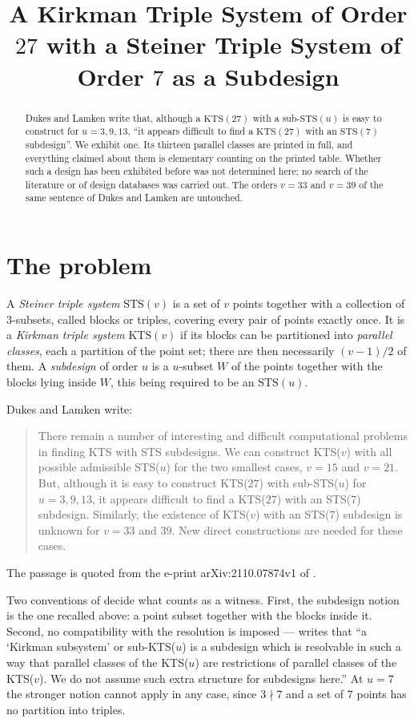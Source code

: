 \documentclass[11pt]{amsart}
\title[A $\KTS(27)$ with an $\STS(7)$ subdesign]
{A Kirkman Triple System of Order $27$ with a Steiner Triple System of
Order $7$ as a Subdesign}
\date{}
\theoremstyle{remark}
\newcommand{\KTS}{\mathrm{KTS}}
\newcommand{\STS}{\mathrm{STS}}
\begin{document}
\begin{abstract}
Dukes and Lamken write that, although a $\KTS(27)$ with a sub-$\STS(u)$ is easy
to construct for $u=3,9,13$, ``it appears difficult to find a $\KTS(27)$ with an
$\STS(7)$ subdesign''. We exhibit one. Its thirteen parallel classes are printed
in full, and everything claimed about them is elementary counting on the printed
table. Whether such a design has been exhibited before was not determined here;
no search of the literature or of design databases was carried out. The orders
$v=33$ and $v=39$ of the same sentence of Dukes and Lamken are untouched.
\end{abstract}

\maketitle

\section{The problem}

A \emph{Steiner triple system} $\STS(v)$ is a set of $v$ points together with a
collection of $3$-subsets, called blocks or triples, covering every pair of
points exactly once. It is a \emph{Kirkman triple system} $\KTS(v)$ if its
blocks can be partitioned into \emph{parallel classes}, each a partition of the
point set; there are then necessarily $(v-1)/2$ of them. A \emph{subdesign} of
order $u$ is a $u$-subset $W$ of the points together with the blocks lying
inside $W$, this being required to be an $\STS(u)$.

Dukes and Lamken \cite{DL} write:
\begin{quote}
There remain a number of interesting and difficult computational problems in
finding KTS with STS subdesigns. We can construct KTS($v$) with all possible
admissible STS($u$) for the two smallest cases, $v=15$ and $v=21$. But, although
it is easy to construct KTS($27$) with sub-STS($u$) for $u=3,9,13$, it appears
difficult to find a KTS($27$) with an STS($7$) subdesign. Similarly, the
existence of KTS($v$) with an STS($7$) subdesign is unknown for $v=33$ and $39$.
New direct constructions are needed for these cases.
\end{quote}
The passage is quoted from the e-print arXiv:2110.07874v1 of \cite{DL}.

Two conventions of \cite{DL} decide what counts as a witness. First, the
subdesign notion is the one recalled above: a point subset together with the
blocks inside it. Second, no compatibility with the resolution is imposed ---
\cite{DL} writes that ``a `Kirkman subsystem' or sub-KTS($u$) is a
subdesign which is resolvable in such a way that parallel classes of the KTS($u$)
are restrictions of parallel classes of the KTS($v$). We do not assume such
extra structure for subdesigns here.'' At $u=7$ the stronger notion cannot apply
in any case, since $3\nmid 7$ and a set of $7$ points has no partition into
triples.
\end{document}
